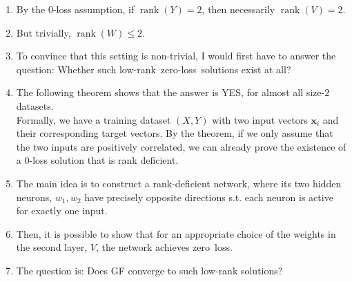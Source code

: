\documentclass[handout,usenames,dvipsnames]{beamer} %
\DeclareMathOperator{\rank}{rank}
\newcommand{\bx}{\mathbf{x}}
\begin{document}
\begin{frame}
{\begin{enumerate}
            \item By the $0$-loss assumption, if $\rank(Y)=2$, then necessarily $\rank(V)=2$.
            \item But trivially, $\rank(W)\leq 2$.
            \item To convince that this setting is non-trivial, I would first have to answer the question: Whether such low-rank~zero-loss~solutions exist at all?
            \item The following theorem shows that the answer is YES, for almost all size-$2$ datasets.\\
            Formally, we have a training dataset $(X, Y)$ with two input vectors $\bx_i$ and their corresponding target vectors. By the theorem, if we only assume that the two inputs are positively correlated, we can already prove the existence of a $0$-loss solution that is rank deficient.
            \item The main idea is to construct a rank-deficient network, where its two hidden neurons, $w_1, w_2$ have precisely opposite directions s.t. each neuron is active for exactly one input. 
            \item Then, it is possible to show that for an appropriate choice of the weights in the second layer, $V$, the network achieves zero~loss.
            \item The question is: Does GF converge to such low-rank solutions?
        \end{enumerate}
    }
\end{frame}
\end{document}
